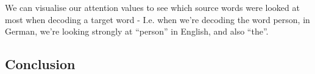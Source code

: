 \documentclass[11pt]{article}
\begin{document}
\begin{minipage}[l]{.6\linewidth}
    \centering
\end{minipage}\hfill
\begin{minipage}[r]{.35\linewidth}
    We can visualise our attention values to see which source words were looked at most when decoding a target word - I.e. when we're decoding the word person, in German, we're looking strongly at ``person'' in English, and also ``the''.
\end{minipage}

\subsection{Conclusion}
\end{document}

